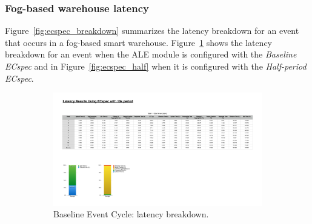 \subsubsection{Fog-based warehouse latency}
\label{subs:eval_exp_latency_ecspec}
Figure~\ref{fig:ecspec_breakdown} summarizes the latency breakdown for an event that occurs in a fog-based
smart warehouse. Figure~\ref{fig:ecspec_base} shows the latency breakdown for an event when the
\gls{ALE} module is configured with the \textit{Baseline ECspec} and in Figure~\ref{fig:ecspec_half}
when it is configured with the \textit{Half-period ECspec}.\\

\begin{figure}[ht!]
 \centering
 \begin{subfigure}{.5\textwidth}
   \centering
   \includegraphics[height=\linewidth]{./images/edge_ecspec_breakdown}
   \caption{Baseline Event Cycle: latency breakdown.}
   \label{fig:ecspec_base}
 \end{subfigure}%
 \begin{subfigure}{.5\textwidth}
   \centering

\end{subfigure}
\end{figure}
